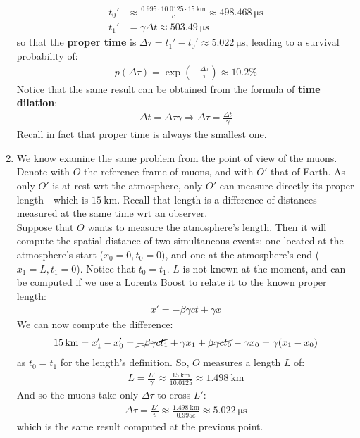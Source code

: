 \documentclass[../template.tex]{subfiles}
\begin{document}
\begin{enumerate}
    \begin{align*}
        t_0' &\approx \frac{0.995 \cdot 10.0125 \cdot \SI{15}{\kilo\m}}{c}  \approx \SI{498.468}{\micro\s}\\
        t_1' &= \gamma \Delta t \approx \SI{503.49}{\micro\s}
    \end{align*}
    so that the \textbf{proper time} is  $\Delta \tau = t_1' - t_0' \approx \SI{5.022}{\micro\s}$, leading to a survival probability of:
    \begin{align*}
        p(\Delta \tau) = \exp\left(-\frac{\Delta \tau}{\tau} \right) \approx 10.2\%
    \end{align*}
    Notice that the same result can be obtained from the formula of \textbf{time dilation}:
    \begin{align*}
        \Delta t = \Delta \tau \gamma \Rightarrow \Delta \tau = \frac{\Delta t}{\gamma} 
    \end{align*} 
    Recall in fact that proper time is always the smallest one.
    \item We know examine the same problem from the point of view of the muons. Denote with $O$ the reference frame of muons, and with $O'$ that of Earth. As only $O'$ is at rest wrt the atmosphere, only $O'$ can measure directly its proper length - which is $\SI{15}{\kilo\m}$. Recall that length is a difference of distances measured at the same time wrt an observer.\\
    Suppose that $O$ wants to measure the atmosphere's length. Then it will compute the spatial distance of two simultaneous events: one located at the atmosphere's start ($x_0 = 0, t_0 = 0$), and one at the atmosphere's end ($x_1 = L, t_1 = 0$). Notice that $t_0 = t_1$. $L$ is not known at the moment, and can be computed if we use a Lorentz Boost to relate it to the known proper length:   
    \begin{align*}
        x' = -\beta \gamma c t + \gamma x
    \end{align*}
    We can now compute the difference:
    \begin{align*}
        \SI{15}{\kilo\m} = x'_1 - x'_0 = \cancel{- \beta \gamma c t_1 }+ \gamma x_1 + \cancel{\beta \gamma ct_0 }- \gamma x_0 = \gamma(x_1 - x_0)   
    \end{align*}
    as $t_0 = t_1$ for the length's definition. So, $O$ measures a length $L$ of:
    \begin{align*}
        L = \frac{L'}{\gamma} \approx \frac{\SI{15}{\kilo\m}}{10.0125} \approx \SI{1.498}{\kilo\m}  
    \end{align*}  
    And so the muons take only $\Delta \tau$ to cross $L'$:
    \begin{align*}
        \Delta \tau = \frac{L'}{v} \approx \frac{\SI{1.498}{\kilo\m}}{0.995 c} \approx \SI{5.022}{\micro\s}  
    \end{align*}  
    which is the same result computed at the previous point.
\end{enumerate}
\end{document}
